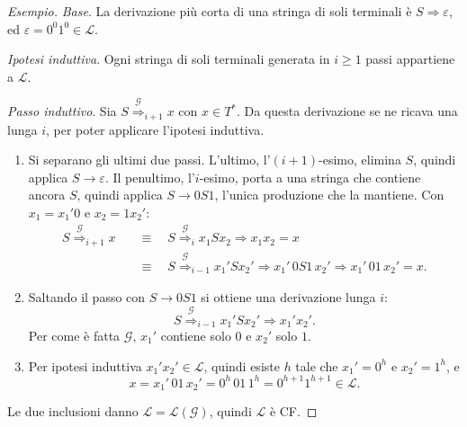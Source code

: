 \documentclass[a4paper, 11pt, oneside]{book}
\theoremstyle{formale}
\newenvironment{esempio}
    {\begin{proof}[\textit{Esempio}]\renewcommand{\qedsymbol}{$\diamond$}}
    {\end{proof}}
\begin{document}
\begin{esempio}
        \textit{Base}. La derivazione pi\`u corta di una stringa di soli terminali \`e
        $S \Rightarrow \varepsilon$, ed $\varepsilon = 0^0 1^0 \in \mathcal{L}$.

        \textit{Ipotesi induttiva}. Ogni stringa di soli terminali generata in $i \geq 1$
        passi appartiene a $\mathcal{L}$.

        \textit{Passo induttivo}. Sia $S \overset{\mathcal{G}}{\Rightarrow}_{i+1} x$ con
        $x \in T^*$. Da questa derivazione se ne ricava una lunga $i$, per poter applicare
        l'ipotesi induttiva.
        \begin{enumerate}
            \item Si separano gli ultimi due passi. L'ultimo, l'$(i + 1)$-esimo, elimina $S$,
                quindi applica $S \to \varepsilon$. Il penultimo, l'$i$-esimo, porta a una
                stringa che contiene ancora $S$, quindi applica $S \to 0S1$, l'unica
                produzione che la mantiene. Con $x_1 = x_1' 0$ e $x_2 = 1 x_2'$:
                \begin{align*}
                    S \overset{\mathcal{G}}{\Rightarrow}_{i+1} x
                    \quad&\equiv\quad
                    S \overset{\mathcal{G}}{\Rightarrow}_i x_1 S x_2 \Rightarrow x_1 x_2 = x
                    \\
                    &\equiv\quad
                    S \overset{\mathcal{G}}{\Rightarrow}_{i-1} x_1' S x_2'
                    \Rightarrow x_1' \, 0S1 \, x_2' \Rightarrow x_1' \, 01 \, x_2' = x.
                \end{align*}
            \item Saltando il passo con $S \to 0S1$ si ottiene una derivazione lunga $i$:
                \begin{equation*}
                    S \overset{\mathcal{G}}{\Rightarrow}_{i-1} x_1' S x_2'
                    \Rightarrow x_1' x_2'.
                \end{equation*}
                Per come \`e fatta $\mathcal{G}$, $x_1'$ contiene solo $0$ e $x_2'$ solo
                $1$.
            \item Per ipotesi induttiva $x_1' x_2' \in \mathcal{L}$, quindi esiste $h$ tale
                che $x_1' = 0^h$ e $x_2' = 1^h$, e
                \begin{equation*}
                    x = x_1' \, 01 \, x_2' = 0^h \, 01 \, 1^h = 0^{h+1} 1^{h+1}
                    \in \mathcal{L}.
                \end{equation*}
        \end{enumerate}
        Le due inclusioni danno $\mathcal{L} = \mathcal{L}(\mathcal{G})$, quindi
        $\mathcal{L}$ \`e CF.
    \end{esempio}
\end{document}
